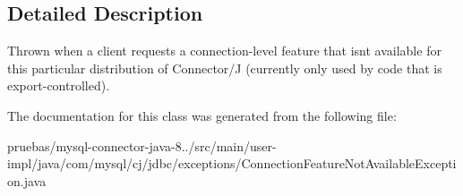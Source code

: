 \subsection{Detailed Description}
Thrown when a client requests a connection-\/level feature that isn\textquotesingle{}t available for this particular distribution of Connector/J (currently only used by code that is export-\/controlled). 

The documentation for this class was generated from the following file\+:\begin{DoxyCompactItemize}
\item 
pruebas/mysql-\/connector-\/java-\/8../src/main/user-\/impl/java/com/mysql/cj/jdbc/exceptions/Connection\+Feature\+Not\+Available\+Exception.\+java\end{DoxyCompactItemize}
